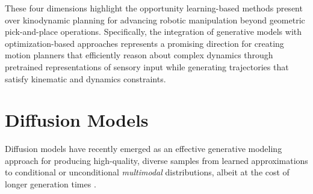 These four dimensions highlight the opportunity learning-based methods present over kinodynamic planning for advancing robotic manipulation beyond geometric pick-and-place operations. Specifically, the integration of generative models with optimization-based approaches represents a promising direction for creating motion planners that efficiently reason about complex dynamics through pretrained representations of sensory input while generating trajectories that satisfy kinematic and dynamics constraints.

\section{Diffusion Models}

Diffusion models have recently emerged as an effective generative modeling approach for producing high-quality, diverse samples from learned approximations to conditional or unconditional \textsl{multimodal} distributions, albeit at the cost of longer generation times \cite{sohl2015deep,ho2020denoising,rombach2022high,nichol2021glide}.

